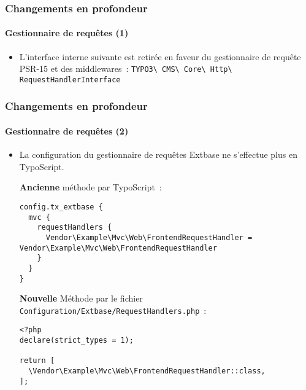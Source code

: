 
\begin{frame}[fragile]
	\frametitle{Changements en profondeur}
	\framesubtitle{Gestionnaire de requêtes (1)}

	\begin{itemize}
		\item L'interface interne suivante est retirée en faveur du gestionnaire de requête PSR-15
			et des middlewares~:\newline
			\texttt{TYPO3\textbackslash
				CMS\textbackslash
				Core\textbackslash
				Http\textbackslash
				RequestHandlerInterface}

	\end{itemize}

\end{frame}


\begin{frame}[fragile]
	\frametitle{Changements en profondeur}
	\framesubtitle{Gestionnaire de requêtes (2)}

	\lstset{basicstyle=\tiny\ttfamily}

	\begin{itemize}
		\item La configuration du gestionnaire de requêtes Extbase ne s'effectue plus en TypoScript.

		\smaller\textbf{Ancienne} méthode par TypoScript~:\normalsize
\begin{lstlisting}
config.tx_extbase {
  mvc {
    requestHandlers {
      Vendor\Example\Mvc\Web\FrontendRequestHandler = Vendor\Example\Mvc\Web\FrontendRequestHandler
    }
  }
}
\end{lstlisting}

		\smaller\textbf{Nouvelle} Méthode par le fichier \texttt{Configuration/Extbase/RequestHandlers.php}~:\normalsize
\begin{lstlisting}
<?php
declare(strict_types = 1);

return [
  \Vendor\Example\Mvc\Web\FrontendRequestHandler::class,
];
\end{lstlisting}

	\end{itemize}

\end{frame}

